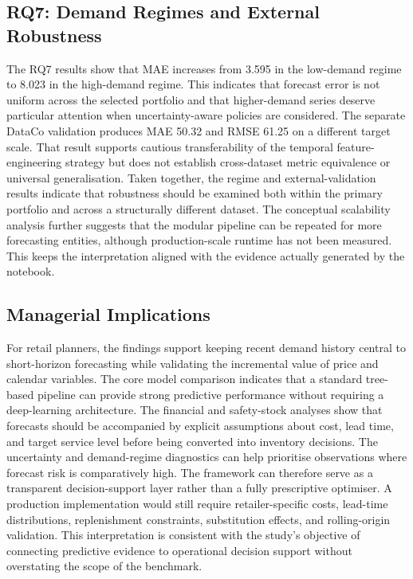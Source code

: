 \subsection{RQ7: Demand Regimes and External Robustness}
The RQ7 results show that MAE increases from 3.595 in the low-demand regime to 8.023 in the high-demand regime.
This indicates that forecast error is not uniform across the selected portfolio and that higher-demand series deserve particular attention when uncertainty-aware policies are considered.
The separate DataCo validation produces MAE 50.32 and RMSE 61.25 on a different target scale.
That result supports cautious transferability of the temporal feature-engineering strategy but does not establish cross-dataset metric equivalence or universal generalisation.
Taken together, the regime and external-validation results indicate that robustness should be examined both within the primary portfolio and across a structurally different dataset.
The conceptual scalability analysis further suggests that the modular pipeline can be repeated for more forecasting entities, although production-scale runtime has not been measured.
This keeps the interpretation aligned with the evidence actually generated by the notebook.

\subsection{Managerial Implications}
For retail planners, the findings support keeping recent demand history central to short-horizon forecasting while validating the incremental value of price and calendar variables.
The core model comparison indicates that a standard tree-based pipeline can provide strong predictive performance without requiring a deep-learning architecture.
The financial and safety-stock analyses show that forecasts should be accompanied by explicit assumptions about cost, lead time, and target service level before being converted into inventory decisions.
The uncertainty and demand-regime diagnostics can help prioritise observations where forecast risk is comparatively high.
The framework can therefore serve as a transparent decision-support layer rather than a fully prescriptive optimiser.
A production implementation would still require retailer-specific costs, lead-time distributions, replenishment constraints, substitution effects, and rolling-origin validation.
This interpretation is consistent with the study's objective of connecting predictive evidence to operational decision support without overstating the scope of the benchmark.


